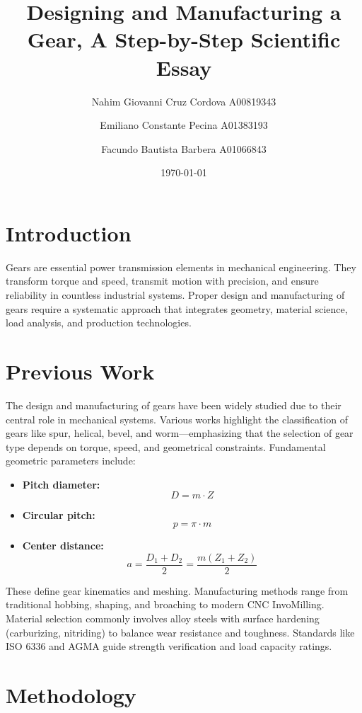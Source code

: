 \documentclass[11pt]{article}
\title{Designing and Manufacturing a Gear, A Step-by-Step Scientific Essay}
\author{
    Nahim Giovanni Cruz Cordova A00819343 \and
    Emiliano Constante Pecina A01383193 \and
    Facundo Bautista Barbera A01066843
}
\date{\today}
\begin{document}
\maketitle

\section*{Introduction}

Gears are essential power transmission elements in mechanical engineering.
They transform torque and speed, transmit motion with precision, and ensure reliability in countless industrial systems.
Proper design and manufacturing of gears require a systematic approach that integrates geometry, material science, load analysis, and production technologies.

\section*{Previous Work}

The design and manufacturing of gears have been widely studied due to their central role in mechanical systems.
Various works highlight the classification of gears like spur, helical, bevel, and worm—emphasizing that the selection of gear type depends on torque, speed, and geometrical constraints.
Fundamental geometric parameters include:

\begin{itemize}
	\item \textbf{Pitch diameter:}
	      \[
		      D = m \cdot Z
	      \]

	\item \textbf{Circular pitch:}
	      \[
		      p = \pi \cdot m
	      \]

	\item \textbf{Center distance:}
	      \[
		      a = \frac{D_1 + D_2}{2} = \frac{m(Z_1 + Z_2)}{2}
	      \]
\end{itemize}

These define gear kinematics and meshing.
Manufacturing methods range from traditional hobbing, shaping, and broaching to modern CNC InvoMilling.
Material selection commonly involves alloy steels with surface hardening (carburizing, nitriding) to balance wear resistance and toughness.
Standards like ISO 6336 and AGMA guide strength verification and load capacity ratings.

\section*{Methodology}
\end{document}
